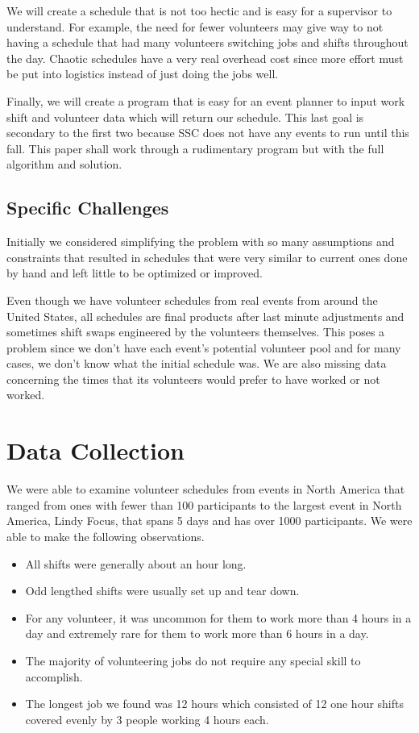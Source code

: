 \documentclass[11pt]{article}
\theoremstyle{definition}
\begin{document}
\begin{multicols}{2}
We will create a schedule that is not too hectic and is easy for a supervisor to understand.
For example, the need for fewer volunteers may give way to not having a schedule that had many volunteers switching jobs and shifts throughout the day.
Chaotic schedules have a very real overhead cost since more effort must be put into logistics instead of just doing the jobs well.

Finally, we will create a program that is easy for an event planner to input work shift and volunteer data which will return our schedule.
This last goal is secondary to the first two because SSC does not have any events to run until this fall.
This paper shall work through a rudimentary program but with the full algorithm and solution.
\subsection{Specific Challenges}
Initially we considered simplifying the problem with so many assumptions and constraints that resulted in schedules that were very similar to current ones done by hand and left little to be optimized or improved.

Even though we have volunteer schedules from real events from around the United States, all schedules are final products after last minute adjustments and sometimes shift swaps engineered by the volunteers themselves.
This poses a problem since we don't have each event's potential volunteer pool and for many cases, we don't know what the initial schedule was.
We are also missing data concerning the times that its volunteers would prefer to have worked or not worked.

%
%
\section{Data Collection}
We were able to examine volunteer schedules from events in North America that ranged from ones with fewer than 100 participants to the largest event in North America, Lindy Focus, that spans 5 days and has over 1000 participants.
We were able to make the following observations.
\begin{itemize}\itemsep0pt
\item All shifts were generally about an hour long.
\item Odd lengthed shifts were usually set up and tear down.
\item For any volunteer, it was uncommon for them to work more than 4 hours in a day and extremely rare for them to work more than 6 hours in a day.
\item The majority of volunteering jobs do not require any special skill to accomplish.
\item The longest job we found was 12 hours which consisted of 12 one hour shifts covered evenly by 3 people working 4 hours each.
\end{itemize}


\end{multicols}
\end{document}
